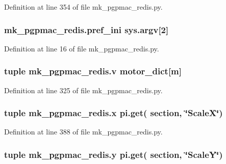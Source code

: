 Definition at line 354 of file mk\-\_\-pgpmac\-\_\-redis.\-py.

\hypertarget{namespacemk__pgpmac__redis_a38c785af5201403976e1267c47ea5096}{
\subsubsection[{pref\-\_\-ini}]{\setlength{\rightskip}{0pt plus 5cm}mk\-\_\-pgpmac\-\_\-redis.\-pref\-\_\-ini sys.\-argv\mbox{[}2\mbox{]}}}\label{namespacemk__pgpmac__redis_a38c785af5201403976e1267c47ea5096}


Definition at line 16 of file mk\-\_\-pgpmac\-\_\-redis.\-py.

\hypertarget{namespacemk__pgpmac__redis_ac732d49b0afca9a9951e3a252bae42fc}{
\subsubsection[{v}]{\setlength{\rightskip}{0pt plus 5cm}tuple mk\-\_\-pgpmac\-\_\-redis.\-v {\bf motor\-\_\-dict}\mbox{[}m\mbox{]}}}\label{namespacemk__pgpmac__redis_ac732d49b0afca9a9951e3a252bae42fc}


Definition at line 325 of file mk\-\_\-pgpmac\-\_\-redis.\-py.

\hypertarget{namespacemk__pgpmac__redis_abc8696f6f2f3fd3edd30989d3c8ec301}{
\subsubsection[{x}]{\setlength{\rightskip}{0pt plus 5cm}tuple mk\-\_\-pgpmac\-\_\-redis.\-x pi.\-get( section, \char`\"{}Scale\-X\char`\"{})}}\label{namespacemk__pgpmac__redis_abc8696f6f2f3fd3edd30989d3c8ec301}


Definition at line 388 of file mk\-\_\-pgpmac\-\_\-redis.\-py.

\hypertarget{namespacemk__pgpmac__redis_a34220d58136fb95853f54ed51a130f79}{
\subsubsection[{y}]{\setlength{\rightskip}{0pt plus 5cm}tuple mk\-\_\-pgpmac\-\_\-redis.\-y pi.\-get( section, \char`\"{}Scale\-Y\char`\"{})}}\label{namespacemk__pgpmac__redis_a34220d58136fb95853f54ed51a130f79}



